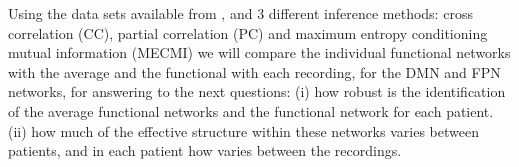 \documentclass[a4paper,12pt]{article}
\begin{document}
Using the data sets available from \cite{Gordon2017}, and 3 different inference methods: cross correlation (CC), partial correlation (PC) and maximum entropy conditioning mutual information (MECMI) we will compare the individual functional networks with the average and the functional with each recording, for the DMN and FPN networks, for answering to the next questions:
(i)  how robust is the identification of the average functional networks and the functional network for each patient.
(ii) how much of the effective structure within these networks varies between patients, and in each patient how varies between the recordings.




\end{document}
